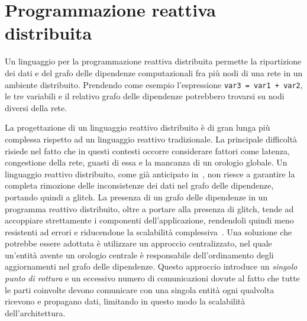 \documentclass[12pt,a4paper,openright,twoside]{book}
\begin{document}
\section{Programmazione reattiva distribuita}
Un linguaggio per la programmazione reattiva distribuita permette la ripartizione dei dati e del grafo delle dipendenze computazionali fra più nodi di una rete in un ambiente distribuito. 
Prendendo come esempio l'espressione \texttt{var3 = var1 + var2}, le tre variabili e il relativo grafo delle dipendenze potrebbero trovarsi su nodi diversi della rete. 

La progettazione di un linguaggio reattivo distribuito è di gran lunga più complessa rispetto ad un linguaggio reattivo tradizionale. La principale difficoltà risiede nel fatto che in questi contesti occorre considerare fattori come latenza, congestione della rete, guasti di essa e la mancanza di un orologio globale. Un linguaggio reattivo distribuito, come già anticipato in~, non riesce a garantire la completa rimozione delle inconsistenze dei dati nel grafo delle dipendenze, portando quindi a glitch. La presenza di un grafo delle dipendenze in un programma reattivo distribuito, oltre a portare alla presenza di glitch, tende ad accoppiare strettamente i componenti dell'applicazione, rendendoli quindi meno resistenti ad errori e riducendone la scalabilità complessiva~\cite{DBLP:journals/programming/MyterSM19}. 
Una soluzione che potrebbe essere adottata è utilizzare un approccio centralizzato, nel quale un'entità avente un orologio centrale è responsabile dell'ordinamento degli aggiornamenti nel grafo delle dipendenze. Questo approccio introduce un \textit{singolo punto di rottura} e un eccessivo numero di comunicazioni dovute al fatto che tutte le parti coinvolte devono comunicare con una singola entità ogni qualvolta ricevono e propagano dati, limitando in questo modo la scalabilità dell'architettura. 
\end{document}
